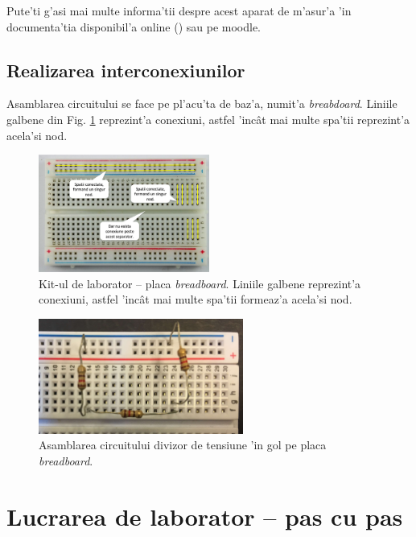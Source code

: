 Pute'ti g'asi mai multe informa'tii despre acest aparat de m'asur'a 'in documenta'tia disponibil'a online (\cite{multimeter_manual}) sau pe moodle.

\subsection{Realizarea interconexiunilor}

Asamblarea circuitului se face pe pl'acu'ta de baz'a, numit'a \textit{breabdoard}. Liniile galbene din Fig. \ref{fig:4_breadboard_prel} reprezint'a conexiuni, astfel 'inc\^at mai multe spa'tii reprezint'a acela'si nod.

\begin{figure}[!b]
	\centering
		\includegraphics[width=0.5\textwidth]{figuri/4_breadboard_prel}
	\caption{Kit-ul de laborator -- placa \textit{breadboard}. Liniile galbene reprezint'a conexiuni, astfel 'inc\^at mai multe spa'tii formeaz'a acela'si nod.}
	\label{fig:4_breadboard_prel}
\end{figure}
\begin{figure}[!b]
	\centering
		\includegraphics[width=0.6\textwidth]{figuri/4_divizor_gol_schema}
	\caption{Asamblarea circuitului divizor de tensiune 'in gol pe placa \textit{breadboard}.}
	\label{fig:4_divizor_gol_schema}
\end{figure}



\section{Lucrarea de laborator -- pas cu pas}

